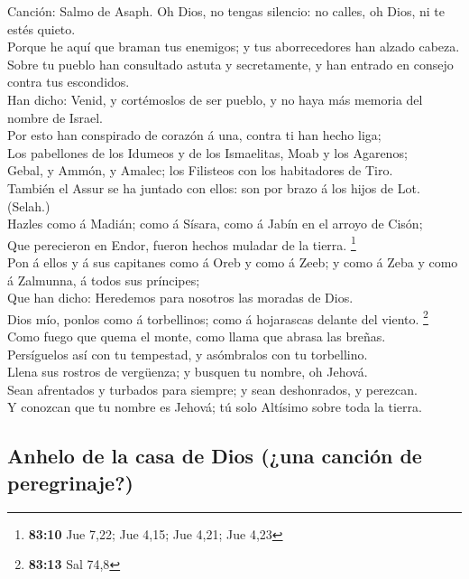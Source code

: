  Canción: Salmo de Asaph. Oh Dios, no tengas silencio: no
calles, oh Dios, ni te estés quieto.\\
 Porque he aquí que braman tus enemigos; y tus aborrecedores
han alzado cabeza.\\
 Sobre tu pueblo han consultado astuta y secretamente, y han
entrado en consejo contra tus escondidos.\\
 Han dicho: Venid, y cortémoslos de ser pueblo, y no haya
más memoria del nombre de Israel.\\
 Por esto han conspirado de corazón á una, contra ti han
hecho liga;\\
 Los pabellones de los Idumeos y de los Ismaelitas, Moab y
los Agarenos;\\
 Gebal, y Ammón, y Amalec; los Filisteos con los habitadores
de Tiro.\\
 También el Assur se ha juntado con ellos: son por brazo á
los hijos de Lot. (Selah.)\\
 Hazles como á Madián; como á Sísara, como á Jabín en el
arroyo de Cisón;\\
 Que perecieron en Endor, fueron hechos muladar de la
tierra. \footnote{\textbf{83:10} Jue 7,22; Jue 4,15; Jue 4,21; Jue 4,23}\\
 Pon á ellos y á sus capitanes como á Oreb y como á Zeeb; y
como á Zeba y como á Zalmunna, á todos sus príncipes;\\
 Que han dicho: Heredemos para nosotros las moradas de
Dios.\\
 Dios mío, ponlos como á torbellinos; como á hojarascas
delante del viento. \footnote{\textbf{83:13} Sal 74,8}\\
 Como fuego que quema el monte, como llama que abrasa las
breñas.\\
 Persíguelos así con tu tempestad, y asómbralos con tu
torbellino.\\
 Llena sus rostros de vergüenza; y busquen tu nombre, oh
Jehová.\\
 Sean afrentados y turbados para siempre; y sean
deshonrados, y perezcan.\\
 Y conozcan que tu nombre es Jehová; tú solo Altísimo sobre
toda la tierra.

\hypertarget{anhelo-de-la-casa-de-dios-una-canciuxf3n-de-peregrinaje}{%
\subsection{Anhelo de la casa de Dios (¿una canción de
peregrinaje?)}\label{anhelo-de-la-casa-de-dios-una-canciuxf3n-de-peregrinaje}}

